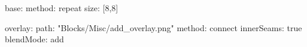 base:
  method: repeat
  size: [8,8]

overlay:
  path: "Blocks/Misc/add_overlay.png"
  method: connect
  innerSeams: true
  blendMode: add
  
